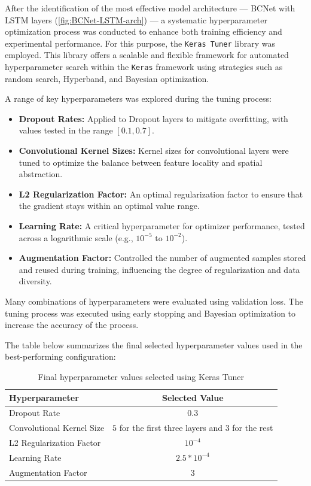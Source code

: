 After the identification of the most effective model architecture --- BCNet with LSTM layers (\autoref{fig:BCNet-LSTM-arch}) --- a systematic hyperparameter optimization process was conducted to enhance both training efficiency and experimental performance. For this purpose, the \texttt{Keras Tuner} library was employed. This library offers a scalable and flexible framework for automated hyperparameter search within the \texttt{Keras} framework using strategies such as random search, Hyperband, and Bayesian optimization.

A range of key hyperparameters was explored during the tuning process:

\begin{itemize}
  \item \textbf{Dropout Rates:} Applied to Dropout layers to mitigate overfitting, with values tested in the range \([0.1, 0.7]\).
  \item \textbf{Convolutional Kernel Sizes:} Kernel sizes for convolutional layers were tuned to optimize the balance between feature locality and spatial abstraction.
  \item \textbf{L2 Regularization Factor:} An optimal regularization factor to ensure that the gradient stays within an optimal value range.
  \item \textbf{Learning Rate:} A critical hyperparameter for optimizer performance, tested across a logarithmic scale (e.g., \(10^{-5}\) to \(10^{-2}\)).
  \item \textbf{Augmentation Factor:} Controlled the number of augmented samples stored and reused during training, influencing the degree of regularization and data diversity.
\end{itemize}

Many combinations of hyperparameters were evaluated using validation loss. The tuning process was executed using early stopping and Bayesian optimization to increase the accuracy of the process.

The table below summarizes the final selected hyperparameter values used in the best-performing configuration:

\begin{table}[H]
  \centering
  \begin{tabular}{|l|c|}
    \hline
    \textbf{Hyperparameter} & \textbf{Selected Value} \\
    \hline
    Dropout Rate & $0.3$ \\
    Convolutional Kernel Size & $5$ for the first three layers and $3$ for the rest \\
    L2 Regularization Factor & $10^{-4}$ \\
    Learning Rate & $2.5 * 10^{-4}$ \\
    Augmentation Factor & $3$ \\
    \hline
  \end{tabular}
  \caption{Final hyperparameter values selected using Keras Tuner}
  \label{tab:hyperparameters}
\end{table}

